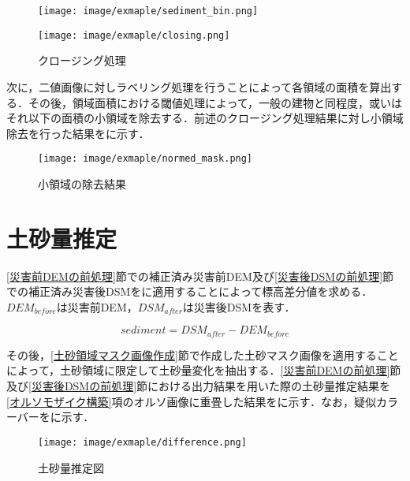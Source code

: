       \begin{figure}[tbp]
        \begin{minipage}[c]{0.5\hsize}
          \centering
          \texttt{[image: image/exmaple/sediment\_bin.png]}
        \end{minipage}
        \begin{minipage}[c]{0.45\hsize}
          \centering
          \texttt{[image: image/exmaple/closing.png]}
        \end{minipage}
        \caption{クロージング処理}
        \label{クロージング処理結果}
      \end{figure}

      次に，二値画像に対しラベリング処理を行うことによって各領域の面積を算出する．その後，領域面積における閾値処理によって，一般の建物と同程度，或いはそれ以下の面積の小領域を除去する．前述のクロージング処理結果に対し小領域除去を行った結果をに示す．
      
      \begin{figure}[tbp]
        \centering
        \texttt{[image: image/exmaple/normed\_mask.png]}
        \caption{小領域の除去結果}
        \label{小領域除去}
      \end{figure}



  \section{土砂量推定}
    \label{土砂量推定}
    \ref{災害前DEMの前処理}節での補正済み災害前DEM及び\ref{災害後DSMの前処理}節での補正済み災害後DSMをに適用することによって標高差分値を求める．$DEM_{before}$は災害前DEM，$DSM_{after}$は災害後DSMを表す．
    
    \begin{equation}
      \label{土砂量推定式}
      sediment = DSM_{after} - DEM_{before}
    \end{equation}

    その後，\ref{土砂領域マスク画像作成}節で作成した土砂マスク画像を適用することによって，土砂領域に限定して土砂量変化を抽出する．\ref{災害前DEMの前処理}節及び\ref{災害後DSMの前処理}節における出力結果を用いた際の土砂量推定結果を\ref{オルソモザイク構築}項のオルソ画像に重畳した結果をに示す．なお，疑似カラーバーをに示す．

    \begin{figure}[tbp]
      \centering
      \texttt{[image: image/exmaple/difference.png]}
      \caption{土砂量推定図}
      \label{土砂量推定結果}
    \end{figure}



